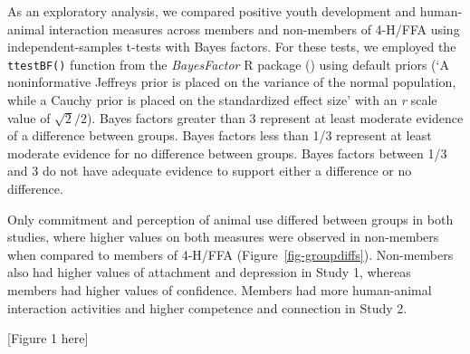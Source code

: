 \documentclass[
  jou,
  longtable,
  nolmodern,
  notxfonts,
  notimes,
  colorlinks=true,linkcolor=blue,citecolor=blue,urlcolor=blue]{apa7}
\begin{document}
As an exploratory analysis, we compared positive youth development and
human-animal interaction measures across members and non-members of
4-H/FFA using independent-samples t-tests with Bayes factors. For these
tests, we employed the \texttt{ttestBF()} function from the
\emph{BayesFactor} R package () using default priors (`A noninformative Jeffreys prior is
placed on the variance of the normal population, while a Cauchy prior is
placed on the standardized effect size' with an \emph{r} scale value of
\(\sqrt{2}/2\)). Bayes factors greater than 3 represent at least
moderate evidence of a difference between groups. Bayes factors less
than 1/3 represent at least moderate evidence for no difference between
groups. Bayes factors between 1/3 and 3 do not have adequate evidence to
support either a difference or no difference.

Only commitment and perception of animal use differed between groups in
both studies, where higher values on both measures were observed in
non-members when compared to members of 4-H/FFA
(Figure~\ref{fig-groupdiffs}). Non-members also had higher values of
attachment and depression in Study 1, whereas members had higher values
of confidence. Members had more human-animal interaction activities and
higher competence and connection in Study 2.

{[}Figure 1 here{]}
\end{document}
